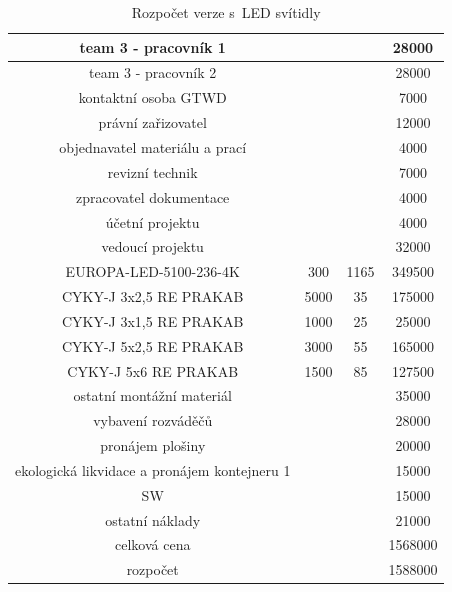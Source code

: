 \documentclass[a4paper, twoside, 11pt]{article}
\begin{document}
\begin{table}[H]
\begin{tabular}{ !{\vrule width 2pt} c | c | c | c  !{\vrule width 2pt}}
				team 3 - pracovník 1 && 28000\\ \hline
				team 3 - pracovník 2 && 28000\\ \hline
				kontaktní osoba GTWD && 7000\\ \hline
				právní zařizovatel && 12000\\ \hline
				objednavatel materiálu a prací && 4000\\ \hline
				revizní technik && 7000\\ \hline
				zpracovatel dokumentace && 4000\\ \hline
				účetní projektu && 4000\\ \hline
				vedoucí projektu && 32000\\ \hline
				EUROPA-LED-5100-236-4K & 300 & 1165 & 349500\\ \hline
				CYKY-J 3x2,5 RE PRAKAB & 5000 & 35 & 175000\\ \hline
				CYKY-J 3x1,5 RE PRAKAB & 1000 & 25 & 25000\\ \hline
				CYKY-J 5x2,5 RE PRAKAB & 3000 & 55 & 165000\\ \hline
				CYKY-J 5x6 RE PRAKAB & 1500 & 85 & 127500\\ \hline
				ostatní montážní materiál && 35000\\ \hline
				vybavení rozváděčů && 28000\\ \hline
				pronájem plošiny && 20000\\ \hline
				ekologická likvidace a pronájem kontejneru 1 && 15000\\ \hline
				SW && 15000\\ \hline
				ostatní náklady && 21000\\ 
				celková cena && 1568000\\ \hline
				rozpočet && 1588000\\ \hline
				
				\end{tabular}
			\caption{Rozpočet verze s~LED svítidly}
			\end{table}
			
\end{document}
